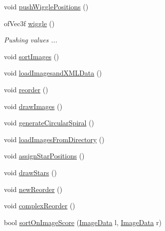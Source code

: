 \begin{DoxyCompactItemize}
\item 
void \hyperlink{classtest_app_aaa5c2175be1d5ca404c3c23a898d0cdd}{push\-Wiggle\-Positions} ()
\item 
of\-Vec3f \hyperlink{classtest_app_acd718eb54b9dc2b45e463414c24de6b9}{wiggle} ()
\begin{DoxyCompactList}\small\item\em Pushing values ... \end{DoxyCompactList}\item 
void \hyperlink{classtest_app_a8a5d9dd51b5c7058ed88611b6ab2b57d}{sort\-Images} ()
\item 
void \hyperlink{classtest_app_aa93380112b906e2aac2d8738309b2d17}{load\-Imagesand\-X\-M\-L\-Data} ()
\item 
void \hyperlink{classtest_app_ab3aec1217fe6743f4ec9ed762148f627}{reorder} ()
\item 
void \hyperlink{classtest_app_a6dbcb5f1e47c842dfd1ab6b188097677}{draw\-Images} ()
\item 
void \hyperlink{classtest_app_aa30f4f1db2d186466f97e6ca15169712}{generate\-Circular\-Spiral} ()
\item 
void \hyperlink{classtest_app_afcb51e1a0b9152b9f6e6b102959bab51}{load\-Images\-From\-Directory} ()
\item 
void \hyperlink{classtest_app_a57e6d61c73ba0244b9d7a8c227aec244}{assign\-Star\-Positions} ()
\item 
void \hyperlink{classtest_app_a3ea688a73ca9eb760a3f0a07fde0ac10}{draw\-Stars} ()
\item 
void \hyperlink{classtest_app_a98baf4cdf9fa0f0a56056322b4e7f7e7}{new\-Reorder} ()
\item 
void \hyperlink{classtest_app_abaca61ce3e4c1b6ce726c907915acf80}{complex\-Reorder} ()
\item 
bool \hyperlink{classtest_app_a81cf913142d9512f9d1063cb7e71199b}{sort\-On\-Image\-Score} (\hyperlink{struct_image_data}{Image\-Data} l, \hyperlink{struct_image_data}{Image\-Data} r)
\end{DoxyCompactItemize}
